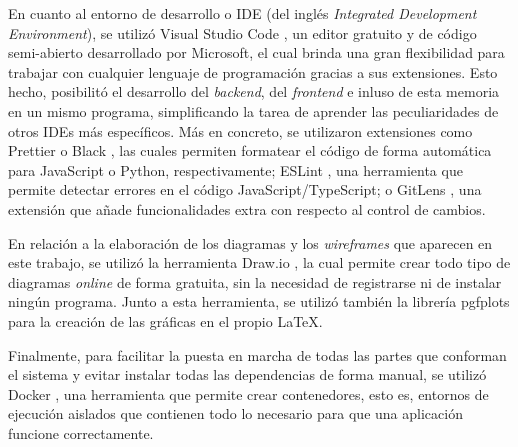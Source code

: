 \bigskip
En cuanto al entorno de desarrollo o IDE (del inglés \textit{Integrated Development Environment}), se utilizó Visual Studio Code \cite{vscode}, un editor gratuito y de código semi-abierto desarrollado por Microsoft, el cual
brinda una gran flexibilidad para trabajar con cualquier lenguaje de programación gracias a sus extensiones. Esto hecho, posibilitó el desarrollo
del \textit{backend}, del \textit{frontend} e inluso de esta memoria en un mismo programa, simplificando la tarea de aprender las peculiaridades de
otros IDEs más específicos. Más en concreto, se utilizaron extensiones como Prettier \cite{prettier} o Black \cite{blackformatter}, las cuales permiten formatear el código de forma automática para JavaScript o Python, respectivamente;
ESLint \cite{eslint}, una herramienta que permite detectar errores en el código JavaScript/TypeScript; o GitLens \cite{gitlens}, una extensión que añade funcionalidades extra con respecto
al control de cambios.

\bigskip
En relación a la elaboración de los diagramas y los \textit{wireframes} que aparecen en este trabajo, se utilizó la herramienta Draw.io \cite{drawio}, la cual permite crear todo tipo de diagramas
\textit{online} de forma gratuita, sin la necesidad de registrarse ni de instalar ningún programa.
Junto a esta herramienta, se utilizó también la librería pgfplots \cite{pgfplots} para la creación de las gráficas en el propio \LaTeX.

\bigskip
Finalmente, para facilitar la puesta en marcha de todas las partes que conforman el sistema y evitar instalar todas las dependencias de forma manual, se utilizó Docker \cite{docker},
una herramienta que permite crear contenedores, esto es, entornos de ejecución aislados que contienen todo lo necesario para que una aplicación funcione correctamente.
